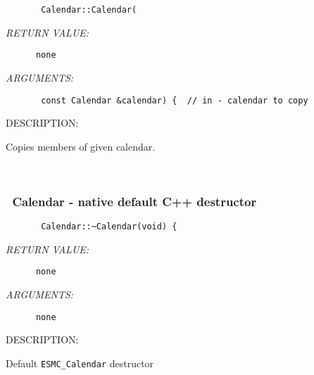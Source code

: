   
\begin{verbatim}       Calendar::Calendar(\end{verbatim}{\em RETURN VALUE:}
\begin{verbatim}      none\end{verbatim}{\em ARGUMENTS:}
\begin{verbatim}       const Calendar &calendar) {  // in - calendar to copy\end{verbatim}
{\sf DESCRIPTION:\\ }


        Copies members of given calendar.
   
 
\mbox{}\hrulefill\ 
 
\subsubsection [~Calendar] {~Calendar - native default C++ destructor}


  
\begin{verbatim}       Calendar::~Calendar(void) {\end{verbatim}{\em RETURN VALUE:}
\begin{verbatim}      none\end{verbatim}{\em ARGUMENTS:}
\begin{verbatim}      none\end{verbatim}
{\sf DESCRIPTION:\\ }


        Default {\tt ESMC\_Calendar} destructor
  
\setlength{\parskip}{\oldparskip}
\setlength{\parindent}{\oldparindent}
\setlength{\baselineskip}{\oldbaselineskip}
